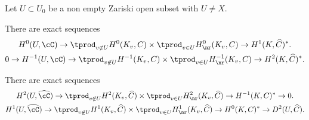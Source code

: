\pagebreak[2]
\begin{lem} \label{ptstart}
Let $U \subset U_0$ be a non empty Zariski open subset with $U \neq X$.
\begin{enumeratea}
\item\label{ptstarta}
There are exact sequences\vspace*{-3pt}
\begin{gather*}
H^0(U,\cC) \to \tprod_{v \not \in U} H^0(K_v,C) \times \tprod_{v \in U}
H^0_{\nr}(K_v,C) \to H^1(K,\widehat C)^*.
\\
0 \to
H^{-1}(U,\cC) \to \tprod_{v \not \in U} H^{-1}(K_v,C) \times \tprod_{v \in U}
H^{-1}_{\nr}(K_v,C) \to H^2(K,\widehat C)^*.
\end{gather*}
\item\label{ptstartb}
There are exact sequences\vspace*{-3pt}
\begin{gather*}
H^2(U,\widehat \cC) \to \tprod_{v \not \in U} H^2(K_v,\widehat C)
\times \tprod_{v \in U}
H^2_{\nr}(K_v,\widehat C) \to H^{-1}(K,C)^* \to 0.
\\
H^{1}(U,\widehat \cC) \to \tprod_{v \not \in U} H^{1}(K_v,\widehat C)
\times \tprod_{v \in U} H^{1}_{\nr}(K_v,\widehat C) \to H^0(K,C)^* \to
D^2(U,\widehat C).\vspace*{-3pt}
\end{gather*}
\end{enumeratea}
\end{lem}

